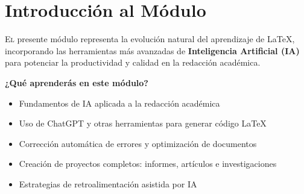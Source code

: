 \documentclass[11pt,letterpaper]{article}
\newcommand{\titulo}[1]{\textcolor{azulprofundo}{\textbf{\huge #1}}}
\begin{document}
%	
%	
%	
%	
%	
%	
%	


\tableofcontents
\newpage


\section{Introducción al Módulo}

\lettrine{E}{l} presente módulo representa la evolución natural del aprendizaje de \LaTeX, incorporando las herramientas más avanzadas de \textbf{Inteligencia Artificial (IA)} para potenciar la productividad y calidad en la redacción académica.

\begin{cajateoria}
	\textbf{¿Qué aprenderás en este módulo?}
	\begin{itemize}
		\item Fundamentos de IA aplicada a la redacción académica
		\item Uso de ChatGPT y otras herramientas para generar código \LaTeX
		\item Corrección automática de errores y optimización de documentos
		\item Creación de proyectos completos: informes, artículos e investigaciones
		\item Estrategias de retroalimentación asistida por IA
	\end{itemize}
\end{cajateoria}
\end{document}

